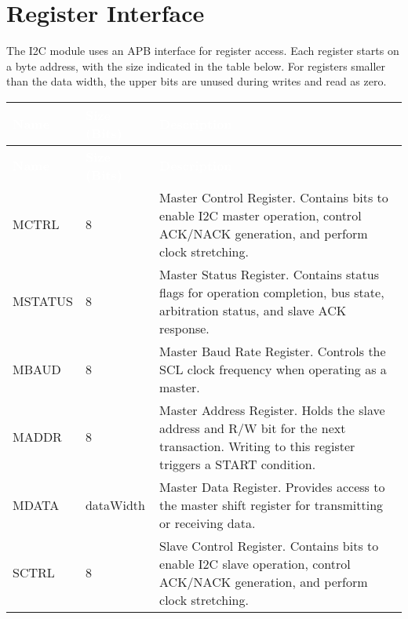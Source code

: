 \section{Register Interface}

The I2C module uses an APB interface for register access. Each register starts on a byte address, with the size indicated in the table below. For registers smaller than the data width, the upper bits are unused during writes and read as zero.

\renewcommand*{\arraystretch}{1.4}
\begingroup
\small
{} %
\begin{longtable}[H]{
  | p{}
  | p{}
  | p{} |
  }
  \hline
  \rowcolor{gray}

  \textcolor{white}{\textbf{Name}} &   
  \textcolor{white}{\textbf{Size (Bits)}} &   
  \textcolor{white}{\textbf{Description}} \\ \hline \hline
  \endfirsthead

  \textcolor{white}{\textbf{Name}} &   
  \textcolor{white}{\textbf{Size (Bits)}} &   
  \textcolor{white}{\textbf{Description}} \\ \hline \hline
  \endhead

  
  MCTRL  &   
  8 &   
  Master Control Register. Contains bits to enable I2C master operation, control ACK/NACK generation, and perform clock stretching. \\ \hline

  MSTATUS &   
  8 &   
  Master Status Register. Contains status flags for operation completion, bus state, arbitration status, and slave ACK response. \\ \hline

  MBAUD &   
  8 &   
  Master Baud Rate Register. Controls the SCL clock frequency when operating as a master. \\ \hline

  MADDR &   
  8 &   
  Master Address Register. Holds the slave address and R/W bit for the next transaction. Writing to this register triggers a START condition. \\ \hline

  MDATA &   
  dataWidth &   
  Master Data Register. Provides access to the master shift register for transmitting or receiving data. \\ \hline

  SCTRL  &   
  8 &   
  Slave Control Register. Contains bits to enable I2C slave operation, control ACK/NACK generation, and perform clock stretching. \\ \hline


\end{longtable}
